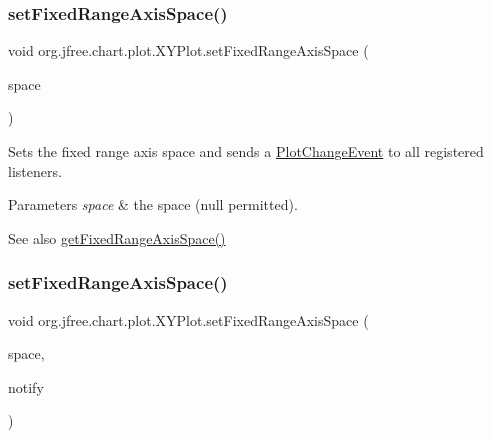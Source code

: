 \subsubsection{\texorpdfstring{set\+Fixed\+Range\+Axis\+Space()}{setFixedRangeAxisSpace()}\hspace{0.1cm}{\footnotesize\ttfamily [1/2]}}
{\footnotesize\ttfamily void org.\+jfree.\+chart.\+plot.\+X\+Y\+Plot.\+set\+Fixed\+Range\+Axis\+Space (\begin{DoxyParamCaption}\item[{\mbox{\hyperlink{classorg_1_1jfree_1_1chart_1_1axis_1_1_axis_space}{Axis\+Space}}}]{space }\end{DoxyParamCaption})}

Sets the fixed range axis space and sends a \mbox{\hyperlink{}{Plot\+Change\+Event}} to all registered listeners.


\begin{DoxyParams}{Parameters}
{\em space} & the space ({\ttfamily null} permitted).\\
\hline
\end{DoxyParams}
\begin{DoxySeeAlso}{See also}
\mbox{\hyperlink{classorg_1_1jfree_1_1chart_1_1plot_1_1_x_y_plot_a26ddb69807bccbfb340cab756a2e0521}{get\+Fixed\+Range\+Axis\+Space()}} 
\end{DoxySeeAlso}
\mbox{\label{classorg_1_1jfree_1_1chart_1_1plot_1_1_x_y_plot_ae759c9c95993b360a0097d826fb2bd62}} 
\subsubsection{\texorpdfstring{set\+Fixed\+Range\+Axis\+Space()}{setFixedRangeAxisSpace()}\hspace{0.1cm}{\footnotesize\ttfamily [2/2]}}
{\footnotesize\ttfamily void org.\+jfree.\+chart.\+plot.\+X\+Y\+Plot.\+set\+Fixed\+Range\+Axis\+Space (\begin{DoxyParamCaption}\item[{\mbox{\hyperlink{classorg_1_1jfree_1_1chart_1_1axis_1_1_axis_space}{Axis\+Space}}}]{space,  }\item[{boolean}]{notify }\end{DoxyParamCaption})}

